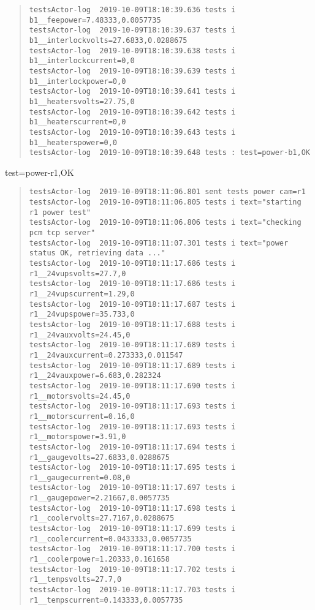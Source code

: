 \begin{quote}
\begin{tiny}
\begin{verbatim}
testsActor-log  2019-10-09T18:10:39.636 tests i b1__feepower=7.48333,0.0057735
testsActor-log  2019-10-09T18:10:39.637 tests i b1__interlockvolts=27.6833,0.0288675
testsActor-log  2019-10-09T18:10:39.638 tests i b1__interlockcurrent=0,0
testsActor-log  2019-10-09T18:10:39.639 tests i b1__interlockpower=0,0
testsActor-log  2019-10-09T18:10:39.641 tests i b1__heatersvolts=27.75,0
testsActor-log  2019-10-09T18:10:39.642 tests i b1__heaterscurrent=0,0
testsActor-log  2019-10-09T18:10:39.643 tests i b1__heaterspower=0,0
testsActor-log  2019-10-09T18:10:39.648 tests : test=power-b1,OK
\end{verbatim}
\end{tiny}
\end{quote}

\noindent test=power-r1,OK

\begin{quote}
\begin{tiny}
\begin{verbatim}
testsActor-log  2019-10-09T18:11:06.801 sent tests power cam=r1
testsActor-log  2019-10-09T18:11:06.805 tests i text="starting r1 power test"
testsActor-log  2019-10-09T18:11:06.806 tests i text="checking pcm tcp server"
testsActor-log  2019-10-09T18:11:07.301 tests i text="power status OK, retrieving data ..."
testsActor-log  2019-10-09T18:11:17.686 tests i r1__24vupsvolts=27.7,0
testsActor-log  2019-10-09T18:11:17.686 tests i r1__24vupscurrent=1.29,0
testsActor-log  2019-10-09T18:11:17.687 tests i r1__24vupspower=35.733,0
testsActor-log  2019-10-09T18:11:17.688 tests i r1__24vauxvolts=24.45,0
testsActor-log  2019-10-09T18:11:17.689 tests i r1__24vauxcurrent=0.273333,0.011547
testsActor-log  2019-10-09T18:11:17.689 tests i r1__24vauxpower=6.683,0.282324
testsActor-log  2019-10-09T18:11:17.690 tests i r1__motorsvolts=24.45,0
testsActor-log  2019-10-09T18:11:17.693 tests i r1__motorscurrent=0.16,0
testsActor-log  2019-10-09T18:11:17.693 tests i r1__motorspower=3.91,0
testsActor-log  2019-10-09T18:11:17.694 tests i r1__gaugevolts=27.6833,0.0288675
testsActor-log  2019-10-09T18:11:17.695 tests i r1__gaugecurrent=0.08,0
testsActor-log  2019-10-09T18:11:17.697 tests i r1__gaugepower=2.21667,0.0057735
testsActor-log  2019-10-09T18:11:17.698 tests i r1__coolervolts=27.7167,0.0288675
testsActor-log  2019-10-09T18:11:17.699 tests i r1__coolercurrent=0.0433333,0.0057735
testsActor-log  2019-10-09T18:11:17.700 tests i r1__coolerpower=1.20333,0.161658
testsActor-log  2019-10-09T18:11:17.702 tests i r1__tempsvolts=27.7,0
testsActor-log  2019-10-09T18:11:17.703 tests i r1__tempscurrent=0.143333,0.0057735

\end{verbatim}
\end{tiny}
\end{quote}
